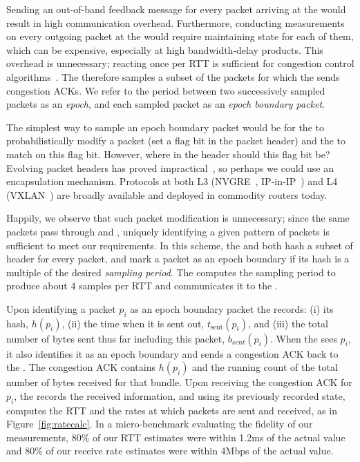 Sending an out-of-band feedback message for every packet arriving at the \outbox would result in high communication overhead. 
Furthermore, conducting measurements on every outgoing packet at the \inbox would require maintaining state for each of them, which can be expensive, especially at high bandwidth-delay products. 
This overhead is unnecessary; reacting once per RTT is sufficient for congestion control algorithms~\cite{ccp}. 
The \inbox therefore samples a subset of the packets for which the \outbox sends congestion ACKs.
We refer to the period between two successively sampled packets as an \emph{epoch}, and each sampled packet as an \emph{epoch boundary packet}.

The simplest way to sample an epoch boundary packet would be for the \inbox to probabilistically modify a packet (\ie set a flag bit in the packet header) and the \outbox to match on this flag bit.
However, where in the header should this flag bit be?
Evolving packet headers has proved impractical~\cite{trotsky}, so perhaps we could use an encapsulation mechanism.
Protocols at both L3 (\eg NVGRE~\cite{nvgre}, IP-in-IP~\cite{ipinip}) and L4 (\eg VXLAN~\cite{vxlan}) are broadly available and deployed in commodity routers today.

Happily, we observe that such packet modification is unnecessary; since the same packets pass through \inbox and \outbox, uniquely identifying a given pattern of packets is sufficient to meet our requirements. In this scheme, the \inbox and \outbox both hash a subset of header for every packet, and mark a packet as an epoch boundary if its hash is a multiple of the desired \emph{sampling period}. The \inbox computes the sampling period to produce about 4 samples per RTT and communicates it to the \outbox. 

Upon identifying a packet $p_i$ as an epoch boundary packet the \inbox records: 
(i) its hash, $h(p_i)$, 
(ii) the time when it is sent out, $t_{\text{sent}}(p_i)$, 
and (iii) the total number of bytes sent thus far including this packet, $b_{sent}(p_i)$. 
When the \outbox sees $p_i$, it also identifies it as an epoch boundary and sends a congestion ACK back to the \inbox. 
The congestion ACK contains $h(p_i)$ and the running count of the total number of bytes received for that bundle. 
Upon receiving the congestion ACK for $p_i$, the \inbox records the received information, and using its previously recorded state, computes the RTT and the rates at which packets are sent and received, as in Figure~\ref{fig:ratecalc}.
In a micro-benchmark evaluating the fidelity of our measurements, 80\% of our RTT estimates were within 1.2ms of the actual value and 80\% of our receive rate estimates were within 4Mbps of the actual value.


